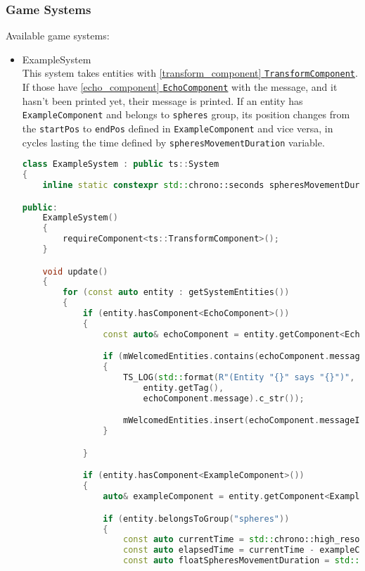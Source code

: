 \subsubsection{Game Systems}
Available game systems:
\begin{itemize}
    \item ExampleSystem\\
    \label{example_system}
    This system takes entities with \hyperref[transform_component]{\ref*{transform_component} \texttt{TransformComponent}}. If those have \hyperref[echo_component]{\ref*{echo_component} \texttt{EchoComponent}} with the message, and it hasn't been printed yet, their message is printed. If an entity has \texttt{ExampleComponent} and belongs to \texttt{spheres} group, its position changes from the \texttt{startPos} to \texttt{endPos} defined in \texttt{ExampleComponent} and vice versa, in cycles lasting the time defined by \texttt{spheresMovementDuration} variable.
\begin{lstlisting}[language=c++, caption=\texttt{ExampleSystem} class (./game/systems/example\_system.hpp)]
class ExampleSystem : public ts::System
{
    inline static constexpr std::chrono::seconds spheresMovementDuration{2s};

public:
    ExampleSystem()
    {
        requireComponent<ts::TransformComponent>();
    }

    void update()
    {
        for (const auto entity : getSystemEntities())
        {
            if (entity.hasComponent<EchoComponent>())
            {
                const auto& echoComponent = entity.getComponent<EchoComponent>();

                if (mWelcomedEntities.contains(echoComponent.messageId))
                {
                    TS_LOG(std::format(R"(Entity "{}" says "{}")",
                        entity.getTag(),
                        echoComponent.message).c_str());

                    mWelcomedEntities.insert(echoComponent.messageId);
                }

            }

            if (entity.hasComponent<ExampleComponent>())
            {
                auto& exampleComponent = entity.getComponent<ExampleComponent>();

                if (entity.belongsToGroup("spheres"))
                {
                    const auto currentTime = std::chrono::high_resolution_clock::now();
                    const auto elapsedTime = currentTime - exampleComponent.startTime;
                    const auto floatSpheresMovementDuration = std::chrono::duration<float>(spheresMovementDuration);


\end{lstlisting}
\end{itemize}
